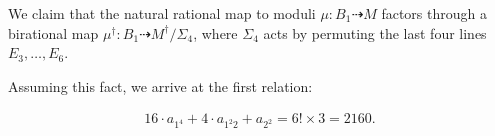 \documentclass{article}
\newcommand{\<}{\left\langle}
\renewcommand{\>}{\right\rangle}
\begin{document}
  We claim that the natural rational map to moduli
  $\mu : B_1 \dashrightarrow M$ factors through a birational map
  $\mu^{\dagger}: B_1 \dashrightarrow M^{\dagger}/\Sigma_{4}$, where
  $\Sigma_{4}$ acts by permuting the last four lines
  $E_{3}, \dots, E_{6}$.

Assuming this fact, we arrive at the first relation:

\begin{align}
  \label{eq:relation1}
  16 \cdot a_{1^4} + 4 \cdot a_{1^2 2} + a_{2^2} = 6! \times 3 = 2160.
\end{align}










%
%
\end{document}
